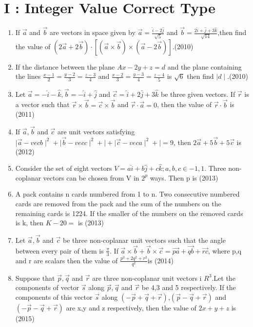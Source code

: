 \documentclass[12pt]{article}
\providecommand{\brak}[1]{\ensuremath{\left(#1\right)}}
\providecommand{\sbrak}[1]{\ensuremath{{}\left[#1\right]}}
\begin{document}
\section*{I    : Integer Value Correct Type }

\begin{enumerate}
\item If $\vec{a}$ and $\vec{b}$ are vectors in space given by $\vec{a}=\frac{\hat{i}-2\hat{j}}{\sqrt{5}}$ and $\vec{b}=\frac{2\hat{i}+\hat{j}+3\hat{k}}{\sqrt{14}}$,then find the value of $\brak{2\vec{a}+2\vec{b}}\cdot\sbrak{\brak{\vec{a}\times\vec{b}}\times\brak{\vec{a}-2\vec{b}}}$.(2010)
\item If the distance between the plane $Ax-2y +z=d$ and the plane containing the lines 
$\frac{x-1}{2}=\frac{y-2}{3}=\frac{z-3}{4}$ and $\frac{x-2}{3}=\frac{y-3}{4}=\frac{z-4}{5}$ is $\sqrt{6}$ then find $\mid d \mid$.(2010)
\item Let $\vec{a}=-\hat{i}-\hat{k},\vec{b}=-\hat{i}+\hat{j}$ and $\vec{c}=\hat{i}+2\hat{j}+3\hat{k}$ be three given vectors. If $\vec{r}$ is a vector such that $\vec{r} \times\vec{b}=\vec{c}\times\vec{b}$ and $\vec{r}\cdot\vec{a}=0$, then the value of $\vec{r}\cdot\vec{b}$ is (2011)
\item If $\vec{a},\vec{b}$ and $\vec{c}$ are unit vectors satisfying $\mid \vec{a}-vec{b}\mid^{2}+\mid \vec{b}-vec{c}\mid^{2}+\mid +\mid \vec{c}-vec{a}\mid^{2}+\mid=9$, then $2\vec{a}+5\vec{b}+5\vec{c}$ is (2012)
\item Consider the set of eight vectors $V={a\hat{i}+b\hat{j}+c\hat{k};a,b,c\in {-1,1} }$. Three non-coplanar vectors can be chosen from V in $2^p$ ways. Then p is (2013)
\item A pack contains n cards numbered from 1 to n. Two consecutive numbered cards are removed from the pack and the sum of the numbers on the remaining cards is 1224. If the
smaller of the numbers on the removed cards is k, then $K-20=$ is (2013)
\item Let $\vec{a},\vec{b}$ and $\vec{c}$ be three non-coplanar unit vectors such that the angle between every pair of them is $\frac{\pi}{3}$. If $\vec{a}\times\vec{b}+\vec{b}\times\vec{c}=\overrightarrow{pa}+\overrightarrow{qb}+\overrightarrow{rc}$, where p,q and r are scalars then the value of $\frac{p^{2}+2q^{2}+r^{2}}{q^2}$is (2014)
\item  Suppose that $\vec{p},\vec{q}$ and $\vec{r}$ are three non-coplanar unit vectors i $R^3$.Let the components of vector $\vec{s}$ along $\vec{p},\vec{q}$ and $\vec{r}$ be 4,3 and 5 respectively. If the components of this vector $\vec{s}$ along $\brak{-\vec{p}+\vec{q}+\vec{r}}$,$\brak{\vec{p}-\vec{q}+\vec{r}}$ and $\brak{-\vec{p}-\vec{q}+\vec{r}}$ are x,y and z respectively, then the value of $2x+y+z$ is (2015)

\end{enumerate}
\end{document}
